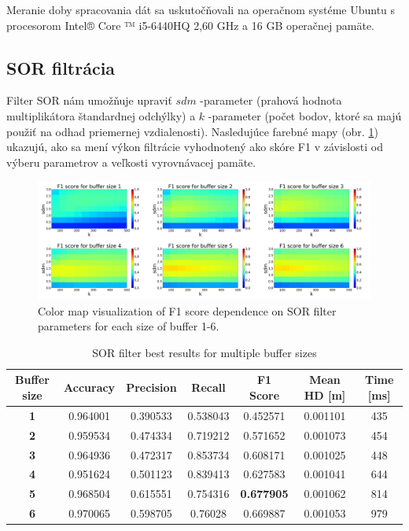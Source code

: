 Meranie doby spracovania dát sa uskutočňovali na operačnom systéme Ubuntu s procesorom Intel® Core ™ i5-6440HQ 2,60 GHz a 16 GB operačnej pamäte. 

\subsection{SOR filtrácia}

Filter SOR nám umožňuje upraviť $sdm$ -parameter (prahová hodnota multiplikátora štandardnej odchýlky) a $k$ -parameter (počet bodov, ktoré sa majú použiť na odhad priemernej vzdialenosti). Nasledujúce farebné mapy (obr. \ref{fig:sorf1}) ukazujú, ako sa mení výkon filtrácie vyhodnotený ako skóre F1 v závislosti od výberu parametrov a veľkosti vyrovnávacej pamäte.

\begin{figure}[h]
	\centering
	\includegraphics[width=\textwidth]{figures/sor_f1.png}
	\caption{Color map visualization of F1 score dependence on SOR filter parameters for each size of buffer 1-6.}
	\label{fig:sorf1}
\end{figure}

\begin{table}[h]
	\centering
	\caption{\label{tab:sor_best} SOR filter best results for multiple buffer sizes }
	\begin{tabular}{ccccccc}
		\toprule
		\textbf{Buffer size} & \textbf{Accuracy} & \textbf{Precision} & \textbf{Recall} & \textbf{F1 Score} & \textbf{Mean HD [m]} & \textbf{Time [ms]} \\ 
		\midrule
		\textbf{1}           & 0.964001          & 0.390533           & 0.538043        & 0.452571          & 0.001101          & 435           \\ 
		\textbf{2}           & 0.959534          & 0.474334           & 0.719212        & 0.571652          & 0.001073          & 454           \\ 
		\textbf{3}           & 0.964936          & 0.472317           & 0.853734        & 0.608171          & 0.001025          & 448           \\ 
		\textbf{4}           & 0.951624          & 0.501123           & 0.839413        & 0.627583          & 0.001041          & 644           \\ 
		\textbf{5}           & 0.968504          & 0.615551           & 0.754316        & \textbf{0.677905}          & 0.001062 & 814           \\ 
		\textbf{6}           & 0.970065          & 0.598705           & 0.76028         & 0.669887          & 0.001053          & 979           \\ 
		\bottomrule
	\end{tabular}
\end{table}

